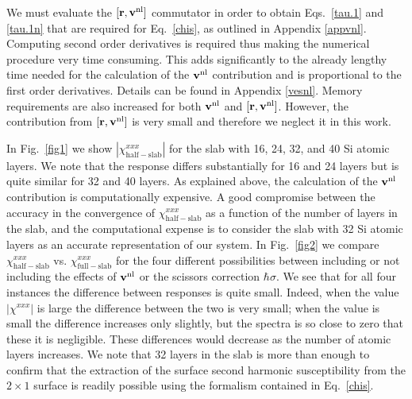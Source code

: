 \documentclass[floatfix,prb,aps,superscriptaddress,11pt,preprint,letterpaper]{revtex4}
\def\chon{red}
\begin{document}
{\color{\chon} 
We must evaluate the $[\mathbf{r},\mathbf{v}^{\mathrm{nl}}]$ commutator in order to obtain 
Eqs.~\eqref{tau.1} and \eqref{tau.1n} that are required for 
Eq.~\eqref{chis}, as outlined in Appendix \ref{appvnl}. Computing second 
order derivatives is required thus making the numerical procedure very 
time consuming. This adds significantly to the already lengthy time needed 
for the calculation of the $\mathbf{v}^{\mathrm{nl}}$ contribution and is proportional to 
the first order derivatives. Details can be found in Appendix \ref{vesnl}. 
Memory requirements are also increased for both $\mathbf{v}^{\mathrm{nl}}$ and 
$[\mathbf{r},\mathbf{v}^{\mathrm{nl}}]$. However, the contribution from $[\mathbf{r},\mathbf{v}^{\mathrm{nl}}]$ 
is very small\cite{valerie} and therefore we neglect it in this work.}

In Fig.~\ref{fig1} we show $|\chi_{\mathrm{half-slab}}^{xxx}|$
for {\color{\chon} the} slab {\color{\chon} with} 
16, 24, 32, and 40 Si atomic layers. 
{\color{\chon} We note that the response differs substantially 
for 16 and 24 layers but is quite similar for 32 and 40 layers.}
As explained above,
the calculation of {\color{\chon} the $\mathbf{v}^{\mathrm{nl}}$ contribution is 
computationally expensive.} 
A good compromise between the accuracy in the convergence of
$\chi^{xxx}_{\mathrm{half-slab}}$ as a function of the number
of layers in the slab, and the computational 
{\color{\chon} expense is to consider} 
the slab with 32 Si atomic layers as 
{\color{\chon} an accurate representation} of our 
{\color{\chon} system.}
In Fig.~\ref{fig2}
we compare 
$\chi^{xxx}_{\mathrm{half-slab}}$  
vs. 
$\chi^{xxx}_{\mathrm{full-slab}}$ 
{\color{\chon} for} the four different possibilities 
{\color{\chon} between} including or not including the
effects of $\mathbf{v}^{\mathrm{nl}}$ {\color{\chon} or the} scissors correction
$\hbar\sigma$.
We see that for all four instances the 
{\color{\chon} difference between responses is quite small}. 
{\color{\chon} Indeed, when the value $|\chi^{xxx}|$ 
is large the difference between the two is very small; 
when the value is small the difference increases only slightly, 
but the spectra is so close to zero that these it is negligible. 
These differences would decrease as the number of atomic layers 
increases. We note that 32 layers in the slab} is more than enough 
to confirm that the extraction of the surface second harmonic 
susceptibility from the $2\times 1$ surface is readily possible 
using the formalism contained in Eq.~\eqref{chis}.
\end{document}
